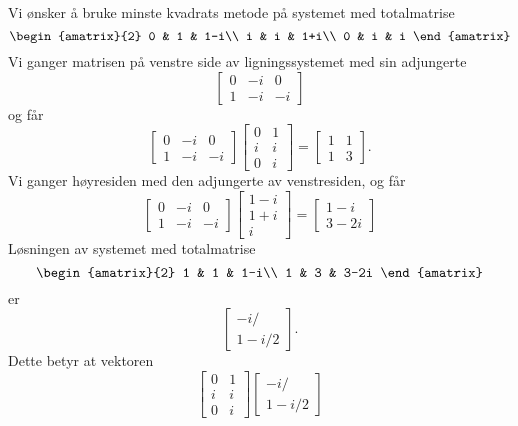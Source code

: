 \begin{ex}
Vi ønsker å bruke minste kvadrats metode på systemet med totalmatrise
\[
\begin{amatrix}{2}
0 & 1   & 1-i\\
i & i &  1+i\\
 0 & i   & i
\end{amatrix}
\]
Vi ganger matrisen på venstre side av ligningssystemet med sin adjungerte
\[
\begin{bmatrix}
0 & -i   & 0\\
1 & -i &  -i
\end{bmatrix}
\]
og får 
\[
\begin{bmatrix}
0 & -i   & 0\\
1 & -i &  -i
\end{bmatrix}
\begin{bmatrix}
0 & 1\\
i & i \\
 0 & i
\end{bmatrix}
=
\begin{bmatrix}
1 & 1\\
 1 & 3
\end{bmatrix}.
\]
Vi ganger høyresiden med den adjungerte av venstresiden, og får
\[
\begin{bmatrix}
0 & -i   & 0\\
1 & -i &  -i
\end{bmatrix}
\begin{bmatrix}
 1-i\\
 1+i \\
 i
\end{bmatrix}
=
\begin{bmatrix}
 1-i\\
 3-2i
\end{bmatrix}
\]
Løsningen av systemet med totalmatrise
\[
\begin{amatrix}{2}
1 & 1   & 1-i\\
1 & 3 &  3-2i
\end{amatrix}
\]
er 
\[
\begin{bmatrix}
-i/  \\
1-i/2  
\end{bmatrix}.
\]
Dette betyr at vektoren 
\[
\begin{bmatrix}
0 & 1   \\
i & i   \\
 0 & i   
\end{bmatrix}
\begin{bmatrix}
-i/  \\
1-i/2  
\end{bmatrix}
\]
\end{ex}
